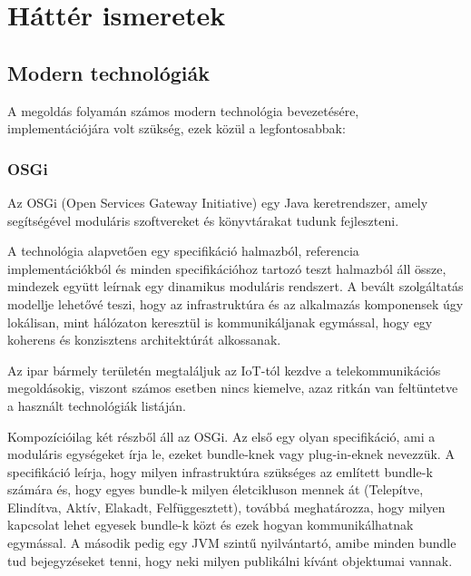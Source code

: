 
\chapter{Háttér ismeretek}
\section{Modern technológiák}

A megoldás folyamán számos modern technológia bevezetésére, implementációjára volt szükség,  ezek közül a legfontosabbak:

\subsection{OSGi}

Az OSGi (Open Services Gateway Initiative) egy Java keretrendszer, amely segítségével moduláris szoftvereket és könyvtárakat tudunk fejleszteni.

A technológia alapvetően egy specifikáció halmazból, referencia implementációkból és minden specifikációhoz tartozó teszt halmazból áll össze, mindezek együtt leírnak egy dinamikus moduláris rendszert. A bevált szolgáltatás modellje lehetővé teszi, hogy az infrastruktúra és az alkalmazás komponensek úgy lokálisan, mint hálózaton keresztül is kommunikáljanak egymással, hogy egy koherens és konzisztens architektúrát alkossanak.

Az ipar bármely területén megtaláljuk az IoT-tól kezdve a telekommunikációs megoldásokig, viszont számos esetben nincs kiemelve, azaz ritkán van feltüntetve a használt technológiák listáján. 

Kompozícióilag két részből áll az OSGi. Az első egy olyan specifikáció, ami a moduláris egységeket írja le, ezeket bundle-knek vagy plug-in-eknek nevezzük. A specifikáció leírja, hogy milyen infrastruktúra szükséges az említett bundle-k számára és, hogy egyes bundle-k milyen életcikluson mennek át (Telepítve, Elindítva, Aktív, Elakadt, Felfüggesztett), továbbá meghatározza, hogy milyen kapcsolat lehet egyesek bundle-k közt és ezek hogyan kommunikálhatnak egymással. A második pedig egy JVM szintű nyilvántartó, amibe minden bundle tud bejegyzéseket tenni, hogy neki milyen publikálni kívánt objektumai vannak.


